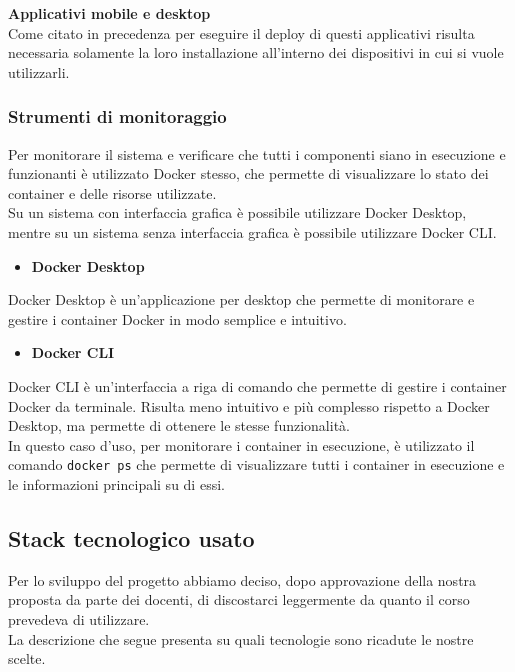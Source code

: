 \documentclass{article}
\begin{document}
\noindent\textbf{Applicativi mobile e desktop}\\
Come citato in precedenza per eseguire il deploy di questi applicativi risulta necessaria solamente la loro installazione all'interno dei dispositivi in cui si vuole utilizzarli.

\subsubsection{Strumenti di monitoraggio}
Per monitorare il sistema e verificare che tutti i componenti siano in esecuzione e funzionanti è utilizzato Docker stesso, che permette di visualizzare lo stato dei container e delle risorse utilizzate.\\
Su un sistema con interfaccia grafica è possibile utilizzare Docker Desktop, mentre su un sistema senza interfaccia grafica è possibile utilizzare Docker CLI.
\begin{itemize}
    \item \textbf{Docker Desktop}
\end{itemize}
Docker Desktop è un'applicazione per desktop che permette di monitorare e gestire i container Docker in modo semplice e intuitivo.
\begin{itemize}
    \item \textbf{Docker CLI}
\end{itemize}
Docker CLI è un'interfaccia a riga di comando che permette di gestire i container Docker da terminale. Risulta meno intuitivo e più complesso rispetto a Docker Desktop, ma permette di ottenere le stesse funzionalità.\\
In questo caso d'uso, per monitorare i container in esecuzione, è utilizzato il comando \texttt{docker ps} che permette di visualizzare tutti i container in esecuzione e le informazioni principali su di essi.

\subsection{Stack tecnologico usato}
Per lo sviluppo del progetto abbiamo deciso, dopo approvazione della nostra proposta da parte dei docenti, di discostarci leggermente da quanto il corso prevedeva di utilizzare.\\
La descrizione che segue presenta su quali tecnologie sono ricadute le nostre scelte.
\end{document}
